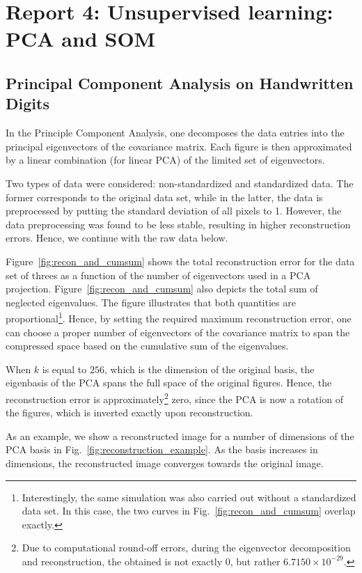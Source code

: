 \documentclass[pdftex,11pt,a4paper]{article}
\begin{document}
\FloatBarrier

\newpage
\section{Report 4: Unsupervised learning: PCA and SOM}

\subsection{Principal Component Analysis on Handwritten Digits}
In the Principle Component Analysis, one decomposes the data entries into the principal eigenvectors of the covariance matrix. Each figure is then approximated by a linear combination (for linear PCA) of the limited set of eigenvectors. 

Two types of data were considered: non-standardized and standardized data. The former corresponds to the original data set, while in the latter, the data is preprocessed by putting the standard deviation of all pixels to 1. However, the data preprocessing was found to be less stable, resulting in higher reconstruction errors. Hence, we continue with the raw data below.

Figure~\ref{fig:recon_and_cumsum} shows the total reconstruction error for the data set of threes as a function of the number of eigenvectors used in a PCA projection. Figure~\ref{fig:recon_and_cumsum} also depicts the total sum of neglected eigenvalues. The figure illustrates that both quantities are proportional\footnote{Interestingly, the same simulation was also carried out without a standardized data set. In this case, the two curves in Fig.~\ref{fig:recon_and_cumsum} overlap exactly.}. Hence, by setting the required maximum reconstruction error, one can choose a proper number of eigenvectors of the covariance matrix to span the compressed space based on the cumulative sum of the eigenvalues.

When $k$ is equal to $256$, which is the dimension of the original basis, the eigenbasis of the PCA spans the full space of the original figures. Hence, the reconstruction error is approximately\footnote{Due to computational round-off errors, during the eigenvector decomposition and reconstruction, the obtained is not exactly $0$, but rather $6.7150 \times 10^{-29}$.} zero, since the PCA is now a rotation of the figures, which is inverted exactly upon reconstruction.

As an example, we show a reconstructed image for a number of dimensions of the PCA basis in Fig.~\ref{fig:reconstruction_example}. As the basis increases in dimensions, the reconstructed image converges towards the original image.
\end{document}
